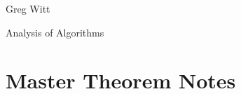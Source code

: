 \documentclass[a4paper,12pt]{article}
\begin{document}
Greg Witt

Analysis of Algorithms

\section*{Master Theorem Notes }






\end{document}
